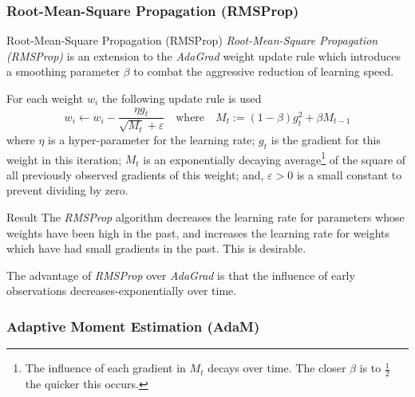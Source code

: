 \documentclass[11pt,a4paper]{article}
\begin{document}
\subsubsection{Root-Mean-Square Propagation (RMSProp)} \label{sec_RMSProp}

  \begin{definition}{Root-Mean-Square Propagation (RMSProp)}
    \textit{Root-Mean-Square Propagation (RMSProp)} is an extension to the \textit{AdaGrad} weight update rule which introduces a smoothing parameter $\beta$ to combat the aggressive reduction of learning speed.
    \par For each weight $w_i$ the following update rule is used
    \[
      w_i\leftarrow w_i-\frac{\eta g_t}{\sqrt{M_t}+\varepsilon}\quad\text{where}\quad M_t:=(1-\beta) g_t^2+\beta M_{t-1}
    \]
    where $\eta$ is a hyper-parameter for the learning rate; $g_t$ is the gradient for this weight in this iteration; $M_t$ is an  exponentially decaying average\footnote{The influence of each gradient in $M_t$ decays over time. The closer $\beta$ is to $\frac12$ the quicker this occurs.} of the square of all previously observed gradients of this weight; and, $\varepsilon>0$ is a small constant to prevent dividing by zero.
  \end{definition}

  \begin{remark}{Result}
    The \textit{RMSProp} algorithm decreases the learning rate for parameters whose weights have been high in the past, and increases the learning rate for weights which have had small gradients in the past. This is desirable.
    \par The advantage of \textit{RMSProp} over \textit{AdaGrad} is that the influence of early observations decreases-exponentially over time.
  \end{remark}

\subsubsection{Adaptive Moment Estimation (AdaM)} \label{sec_AdaM}
\end{document}
